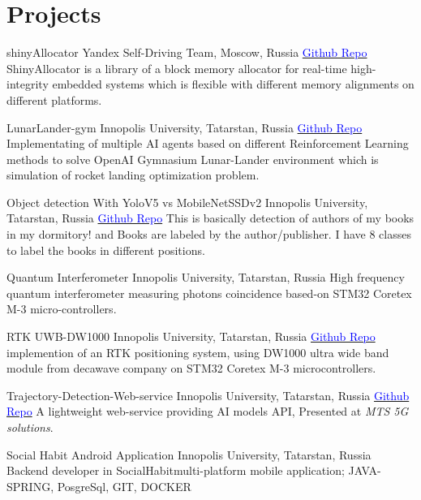 \section{Projects}

    {shinyAllocator}
    {Yandex Self-Driving Team, Moscow, Russia}{}{}
    {\href{https://github.com/Ehsan2754/ShinyAllocator}{\textcolor{blue}{Github Repo}}  
    ShinyAllocator is a library of a block memory allocator for real-time high-integrity embedded systems which is flexible with different memory alignments on different platforms.  }
    

    {LunarLander-gym}
    {Innopolis University, Tatarstan, Russia}{}{}
    {\href{https://github.com/Ehsan2754/lunarlander_gym}{\textcolor{blue}{Github Repo}}  
    Implementating of multiple AI agents based on different Reinforcement Learning methods to solve OpenAI Gymnasium Lunar-Lander environment which is simulation of rocket landing optimization problem.  }
    
    {Object detection With YoloV5 vs MobileNetSSDv2}
    {Innopolis University, Tatarstan, Russia}{}{}
    {\href{https://github.com/Ehsan2754/ObjectDetection}{\textcolor{blue}{Github Repo}}  
   This is basically detection of authors of my books in my dormitory! and Books are labeled by the author/publisher. I have 8 classes to label the books in different positions.}
    

    {Quantum Interferometer}
    {Innopolis University, Tatarstan, Russia}{}{}
    {High frequency quantum interferometer measuring photons coincidence based-on STM32 Coretex M-3 micro-controllers.}
    
    {RTK UWB-DW1000}
    {Innopolis University, Tatarstan, Russia}{}{}
    {\href{https://github.com/Ehsan2754/RTK-DW1000/tree/main/Client}{\textcolor{blue}{Github Repo}}  implemention of an RTK positioning system, using DW1000 ultra wide band module from decawave company on STM32 Coretex M-3 microcontrollers.}

    {Trajectory-Detection-Web-service }
    {Innopolis University, Tatarstan, Russia}{}{}
    {\href{https://github.com/Ahuratus/Trajectory-Detection-Web-services/tree/main/web}{\textcolor{blue}{Github Repo}} A lightweight web-service providing AI models API, Presented  at \textit{MTS 5G solutions}. }

    {Social Habit Android Application}
    {Innopolis University, Tatarstan, Russia}{}{}
    {Backend developer in SocialHabit\texttrademark multi-platform mobile application; JAVA-SPRING, PosgreSql, GIT, DOCKER}
    

